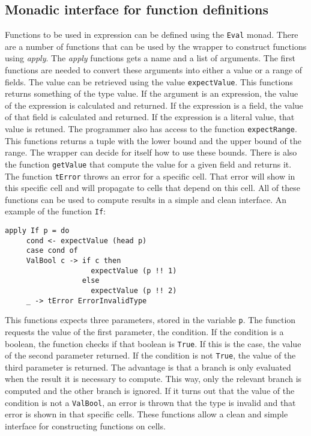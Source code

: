 \documentclass{article}
\begin{document}
	\subsection{Monadic interface for function definitions}
	Functions to be used in expression can be defined using the \texttt{Eval} monad. There are a number of functions that can be used by the wrapper to construct functions using \textit{apply}. The \textit{apply} functions gets a name and a list of arguments. The first functions are needed to convert these arguments into either a value or a range of fields. The value can be retrieved using the value \texttt{expectValue}. This functions returns something of the type value. If the argument is an expression, the value of the expression is calculated and returned. If the expression is a field, the value of that field is calculated and returned. If the expression is a literal value, that value is retuned. The programmer also has access to the function \texttt{expectRange}. This functions returns a tuple with the lower bound and the upper bound of the range. The wrapper can decide for itself how to use these bounds. There is also the function \texttt{getValue} that compute the value for a given field and returns it. The function \texttt{tError} throws an error for a specific cell. That error will show in this specific cell and will propagate to cells that depend on this cell. All of these functions can be used to compute results in a simple and clean interface. An example of the function \texttt{If}:
\begin{verbatim}
apply If p = do
     cond <- expectValue (head p)
     case cond of
     ValBool c -> if c then
                    expectValue (p !! 1)
                  else
                    expectValue (p !! 2)
     _ -> tError ErrorInvalidType                  	
\end{verbatim}	
This functions expects three parameters, stored in the variable \texttt{p}. The function requests the value of the first parameter, the condition. If the condition is a boolean, the function checks if that boolean is \texttt{True}. If this is the case, the value of the second parameter returned. If the condition is not \texttt{True}, the value of the third parameter is returned. The advantage is that a branch is only evaluated when the result it is necessary to compute. This way, only the relevant branch is computed and the other branch is ignored. If it turns out that the value of the condition is not a \texttt{ValBool}, an error is thrown that the type is invalid and that error is shown in that specific cells. These functions allow a clean and simple interface for constructing functions on cells.
\end{document}
